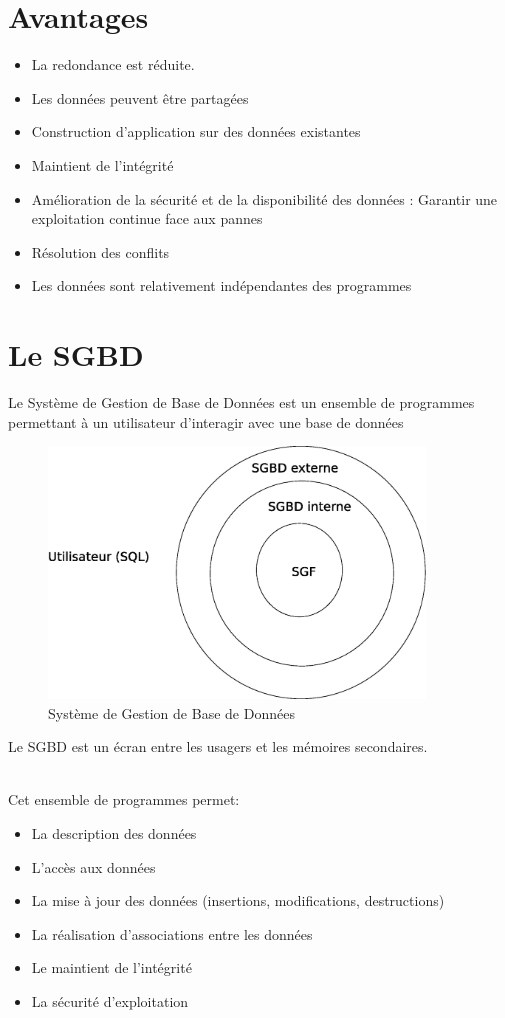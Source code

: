 \documentclass[12pt,a4paper,openany]{book}
\newcommand{\bd}{base de données}
\begin{document}
		\section{Avantages}
		\begin{itemize}
			\item La redondance est réduite.
			\item Les données peuvent être partagées
			\item Construction d'application sur des données existantes
			\item Maintient de l'intégrité
			\item Amélioration de la sécurité et de la disponibilité des données : Garantir une exploitation continue face aux pannes
			\item Résolution des conflits
			\item Les données sont relativement indépendantes des programmes
		\end{itemize}

		\section{Le SGBD}
		\begin{definition}
			Le Système de Gestion de Base de Données est un ensemble de programmes permettant à un utilisateur d'interagir avec une \bd
		\end{definition}
		\begin{figure}[H]
			\centering
			\includegraphics[width=10cm]{sgbd.eps}
			\caption{Système de Gestion de Base de Données}
		\end{figure}
		\begin{remarque}
			Le SGBD est un écran entre les usagers et les mémoires secondaires.\\ ~
		\end{remarque}
		
		Cet ensemble de programmes permet:
		\begin{itemize}
			\item La description des données
			\item L'accès aux données
			\item La mise à jour des données (insertions, modifications, destructions)
			\item La réalisation d'associations entre les données
			\item Le maintient de l'intégrité
			\item La sécurité d'exploitation
		\end{itemize}
\end{document}
